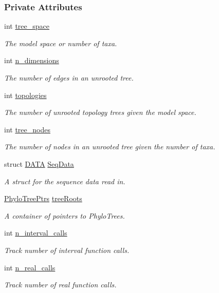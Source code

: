 \subsubsection*{\-Private \-Attributes}
\begin{DoxyCompactItemize}
\item 
int \hyperlink{classFPhyloPOT_a84a8fb3afb2b975331062752d414723a}{tree\-\_\-space}
\begin{DoxyCompactList}\small\item\em \-The model space or number of taxa. \end{DoxyCompactList}\item 
int \hyperlink{classFPhyloPOT_aef4d908d355efec47e284d3845d74b73}{n\-\_\-dimensions}
\begin{DoxyCompactList}\small\item\em \-The number of edges in an unrooted tree. \end{DoxyCompactList}\item 
int \hyperlink{classFPhyloPOT_af68e59b4d63e18f0b82864b101fd29d2}{topologies}
\begin{DoxyCompactList}\small\item\em \-The number of unrooted topology trees given the model space. \end{DoxyCompactList}\item 
int \hyperlink{classFPhyloPOT_ab30590c070d95d5d5d7966cb386db7d6}{tree\-\_\-nodes}
\begin{DoxyCompactList}\small\item\em \-The number of nodes in an unrooted tree given the number of taxa. \end{DoxyCompactList}\item 
struct \hyperlink{structDATA}{\-D\-A\-T\-A} \hyperlink{classFPhyloPOT_aa80ced607ed41f02bcd56b6f08fbd1ff}{\-Seq\-Data}
\begin{DoxyCompactList}\small\item\em \-A struct for the sequence data read in. \end{DoxyCompactList}\item 
\hyperlink{PhyloTree_8hpp_a7924aedff3cf2bea3ffccb7b9f59f970}{\-Phylo\-Tree\-Ptrs} \hyperlink{classFPhyloPOT_a99124f9f8855b0aebcccd20804ef9cde}{tree\-Roots}
\begin{DoxyCompactList}\small\item\em \-A container of pointers to \-Phylo\-Trees. \end{DoxyCompactList}\item 
int \hyperlink{classFPhyloPOT_a6121e3100ec3c00f522f15e1feae0070}{n\-\_\-interval\-\_\-calls}
\begin{DoxyCompactList}\small\item\em \-Track number of interval function calls. \end{DoxyCompactList}\item 
int \hyperlink{classFPhyloPOT_a4e705aece25b8ee32d67aa6ab50cd9ec}{n\-\_\-real\-\_\-calls}
\begin{DoxyCompactList}\small\item\em \-Track number of real function calls. \end{DoxyCompactList}\end{DoxyCompactItemize}


